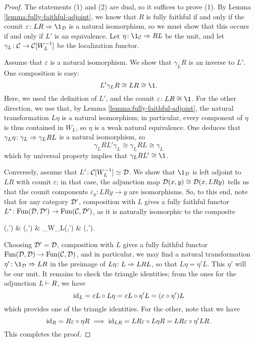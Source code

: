 \begin{proof}
The statements (1) and (2) are dual, so it suffices to prove (1). By Lemma \ref{lemma:fully-faithful-adjoint}, we know that \(R\) is fully faithful if and only if the counit
\(\varepsilon\!:LR\To\1_\calD\) is a natural isomorphism, so we must show that this occurs if and only if \(L'\) is an equivalence. Let \(\eta\!:\1_\calC\To RL\) be the unit,
and let \(\gamma_L\!:\mathcal{C}\to\mathcal{C}[W_L^{-1}]\) be the localization functor.

Assume that \(\varepsilon\) is a natural isomorphism. We show that \(\gamma_L R\) is an inverse to \(L'\). One composition is easy:
\[ L'\gamma_L R \cong LR \cong \1. \]
Here, we used the definition of \(L'\), and the counit \(\varepsilon\!:LR\cong\1\). For the other direction, we use that, by Lemma \ref{lemma:fully-faithful-adjoint}, the
natural transformation \(L\eta\) is a natural isomorphism; in particular, every component of \(\eta\) is thus contained in \(W_L\), so \(\eta\) is a weak natural equivalence.
One deduces that \(\gamma_L\eta\!:\gamma_L\Rightarrow\gamma_L RL\) is a natural isomorphism, so
\[ \gamma_L RL'\gamma_L \cong \gamma_L RL \cong \gamma_L \]
which by universal property implies that \(\gamma_L R L'\cong\1\).

Conversely, assume that \(L'\!:\mathcal{C}[W_L^{-1}]\simeq\mathcal{D}\). We show that \(\1_\calD\) is left adjoint to \(LR\) with counit \(\varepsilon\); in that case, the adjunction map \(\mathcal{D}(x,y)\cong\mathcal{D}(x,LRy)\)
tells us that the counit components \(\varepsilon_y\!: LRy\to y\) are isomorphisms. So, to this end, note that for any category \(\mathcal{D}'\), composition with \(L\)
gives a fully faithful functor \(L^*\!:\operatorname{Fun}(\mathcal{D},\mathcal{D}')\to\operatorname{Fun}(\mathcal{C},\mathcal{D}')\), as it is naturally isomorphic to the composite
\begin{diagram*}
	\Fun(\calD,\calD')  & \Fun(\calC[W_L^{-1}],\calD')  & \Fun_{W_L}(\calC,\calD') \ar[r,hook] & \Fun(\calC,\calD').
\end{diagram*}
Choosing \(\mathcal{D}' = \mathcal{D}\), composition with \(L\) gives a fully faithful functor \(\operatorname{Fun}(\mathcal{D},\mathcal{D})\to\operatorname{Fun}(\mathcal{C},\mathcal{D})\), and in particular, we may find a natural
transformation \(\eta'\!:\1_\calD\To LR\) in the preimage of \(L\eta\!:L\Rightarrow LRL\), so that \(L\eta = \eta'L\). This \(\eta'\) will be our unit. It remains
to check the triangle identities; from the ones for the adjunction \(L \vdash R\), we have
\[ \mathrm{id}_L = \varepsilon L\circ L\eta = \varepsilon L \circ \eta'L = (\varepsilon\circ\eta')L \]
which provides one of the triangle identities. For the other, note that we have
\[ \mathrm{id}_R = R\varepsilon\circ\eta R \implies \mathrm{id}_{LR} = LR\varepsilon\circ L\eta R = LR\varepsilon\circ\eta'LR. \]
This completes the proof.
\end{proof}
